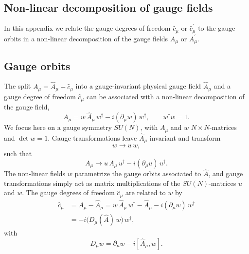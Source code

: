 \documentclass[twocolumn,aps,prd,amsmath,amssymb,preprintnumbers,longbibliography]{revtex4-1}
\numberwithin{equation}{section}
\newenvironment{alignedeqn}{\begin{equation}\begin{aligned}}{\end{aligned}\end{equation}\ignorespacesafterend}
\begin{document}
\begin{appendices}


\section{Non-linear decomposition of gauge fields}
\label{app:non-linear decomposition}

In this appendix we relate the gauge degrees of freedom $\hat{c}_\mu$ or $\hat{c}_\mu^\prime$ to the gauge orbits in a non-linear decomposition of the gauge fields $A_\mu$ or $A_\mu^\prime$.


\subsection{Gauge orbits}

The split $A_\mu = \hat{A}_\mu + \hat{c}_\mu$ into a gauge-invariant physical gauge field $\hat{A}_\mu$ and a gauge degree of freedom $\hat{c}_\mu$ can be associated with a non-linear decomposition of the gauge field,
\begin{equation}\label{eqn:A1}
	A_\mu
	= w \, \hat{A}_\mu \, w^\dagger - i (\partial_\mu w) \, w^\dagger,
	\qquad
	w^\dagger w
	= 1.
\end{equation}
We focus here on a gauge symmetry $SU(N)$, with $A_\mu$ and $w$ $N \times N$-matrices and $\det w = 1$. Gauge transformations leave $\hat{A}_\mu$ invariant and transform
\begin{equation}\label{eqn:A2}
	w
	\to u \, w,
\end{equation}
such that
\begin{equation}\label{eqn:A3}
	A_\mu
	\to u \, A_\mu \, u^\dagger - i (\partial_\mu u) \, u^\dagger.
\end{equation}
The non-linear fields $w$ parametrize the gauge orbits associated to $\hat{A}$, and gauge transformations simply act as matrix multiplications of the $SU(N)$-matrices $u$ and $w$. The gauge degrees of freedom $\hat{c}_\mu$ are related to $w$ by
\begin{alignedeqn}\label{eqn:A4}
	 \hat{c}_\mu
	 &= A_\mu - \hat{A}_\mu
	 = w \, \hat{A}_\mu \, w^\dagger - \hat{A}_\mu - i (\partial_\mu w) \, w^\dagger\\
	 &= -i \bigl(D_\mu(\hat{A}) \, w\bigr) \, w^\dagger,
\end{alignedeqn}
with
\begin{equation}
	D_\mu w
	= \partial_\mu w - i [\hat{A}_\mu,w].
\end{equation}


\end{appendices}
\end{document}
